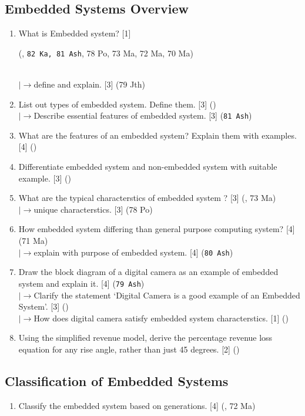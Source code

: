 \documentclass[12pt]{article}
\newcommand{\lb}{\\$\left|\rightarrow\right.$}
\begin{document}
  \subsection{Embedded Systems Overview}
    \begin{enumerate}[topsep=0pt, noitemsep]
      \item What is Embedded system? \hfill [1] \begin{footnotesize} (, \texttt{82 Ka, 81 Ash}, 78 Po, 73 Ma, 72 Ma, 70 Ma) \end{footnotesize}
        \lb define and explain. \hfill [3] (79 Jth)
      
      \item List out types of embedded system. Define them. \hfill [3] ()
        \lb Describe essential features of embedded system. \hfill [3] (\texttt{81 Ash})

      \item What are the features of an embedded system? Explain them with examples. \hfill [4] ()
      
      \item Differentiate embedded system and non-embedded system with suitable example. \hfill [3] ()
      
      \item What are the typical characterstics of embedded system ? \hfill [3] (, 73 Ma)
        \lb unique characterstics. \hfill [3] (78 Po)
      
      
      \item How embedded system differing than general purpose computing system? \hfill [4] (71 Ma)
        \lb explain with purpose of embedded system. \hfill [4] (\texttt{80 Ash})

      \item Draw the block diagram of a digital camera as an example of embedded system and explain it. \hfill [4] (\texttt{79 Ash})
        \lb Clarify the statement `Digital Camera is a good example of an Embedded System'. \hfill [3] ()
        \lb How does digital camera satisfy embedded system characterstics. \hfill [1] ()

      \item Using the simplified revenue model, derive the percentage revenue loss equation for any rise angle, rather than just 45 degrees. \hfill [2] ()
    \end{enumerate}

  \subsection{Classification of Embedded Systems}
    \begin{enumerate}[topsep=0pt, noitemsep]
      \item Classify the embedded system based on generations. \hfill [4] (, 72 Ma)
    \end{enumerate}
\end{document}
